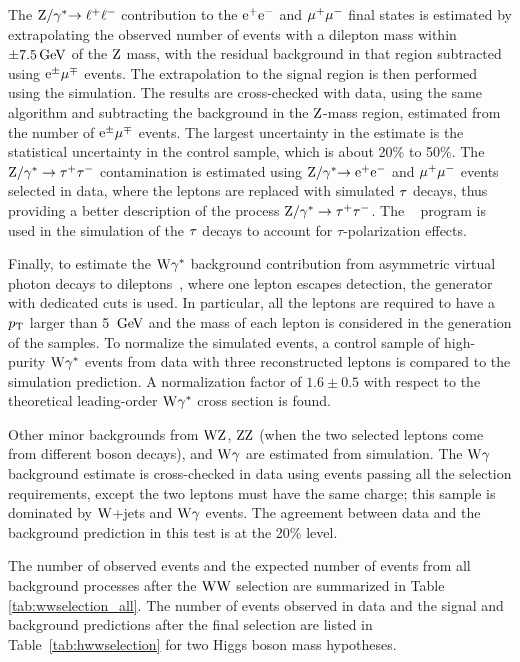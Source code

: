 \documentclass[12pt,twoside,a4paper,cmspaper,final,collab]{cms-tdr}
\begin{document}
The $\mathrm{Z}/\gamma^*{\to \ell^+\ell^-}$ contribution to the $\mathrm{e}^+\mathrm{e}^-$
and ${\mu^+}{\mu^-}$ final states is estimated by extrapolating
the observed number of events with a dilepton mass
within $\pm7.5\,\text{Ge\hspace{-.08em}V}$ of the $\mathrm{Z}$ mass, with the residual
background in that region subtracted using $\mathrm{e}^{\pm}{\mu}^{\mp}$ events.
The extrapolation to the signal region is then performed using the simulation.
The results are cross-checked with data, using the same algorithm and
subtracting the background in the $\mathrm{Z}$-mass region, estimated from the number of $\mathrm{e}^{\pm}{\mu}^{\mp}$ events.
The largest uncertainty in the estimate is the statistical
uncertainty in the control sample, which is about 20\% to 50\%.
The $\mathrm{\mathrm{Z}}/\gamma^* \to\tau^+\tau^-$ contamination is estimated using $\mathrm{\mathrm{Z}}/\gamma^*\mathrm{\to \mathrm{e}^+\mathrm{e}^-}$ and ${\mu^+}{\mu^-}$
events selected in data, where the leptons are replaced with simulated
$\tau$ decays, thus providing a better description of the process $\mathrm{\mathrm{Z}}/\gamma^* \to\tau^+\tau^-$. The \TAUOLA~\cite{TAUOLA}
program is used in the simulation of the $\tau$ decays to account for $\tau$-polarization effects.

Finally, to estimate the $\mathrm{W}\gamma^{*}$ background contribution
from asymmetric virtual photon decays to dileptons~\cite{wgammastart}, where one lepton escapes
detection, the \MADGRAPH generator~\cite{Alwall:2011uj} with dedicated cuts is
used. In particular, all the leptons are required to have a $p_{\mathrm{T}}$ larger than 5 $\,\text{Ge\hspace{-.08em}V}$ and
the mass of each lepton is considered in the generation of the samples. To normalize the
simulated events, a control sample of high-purity $\mathrm{W}\gamma^{*}$ events from data with three
reconstructed leptons is compared to the simulation prediction. A
normalization factor of $1.6\pm0.5$ with respect to the theoretical leading-order
$\mathrm{W}\gamma^{*}$ cross section is found.

Other minor backgrounds from $\mathrm{W}\mathrm{Z}$, $\mathrm{Z}\mathrm{Z}$ (when the two selected leptons come from
different boson decays), and $\mathrm{W}\gamma$ are estimated from simulation.
The $\mathrm{W}\gamma$ background estimate is cross-checked in data using events passing
all the selection requirements, except the two leptons must have the
same charge; this sample is dominated by $\mathrm{W}$+jets and $\mathrm{W}\gamma$
events. The agreement between data and the background prediction in this test is at the 20\% level.

The number of observed events and the expected number of events from
all background processes after the $\mathrm{W}\mathrm{W}$ selection
are summarized in Table \ref{tab:wwselection_all}. The number of events
observed in data and the signal and
background predictions after the final selection are listed in Table~\ref{tab:hwwselection} for two
Higgs boson mass hypotheses.
\end{document}
